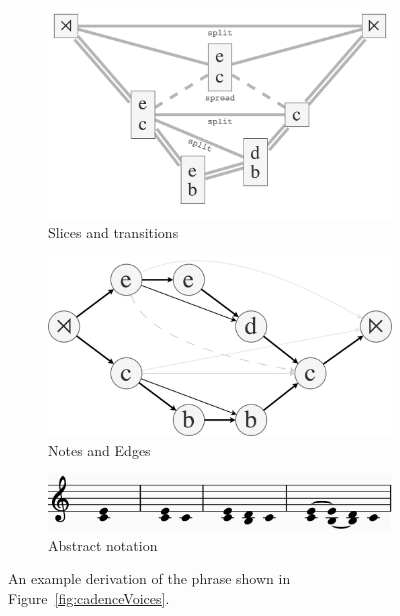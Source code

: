 \documentclass[12pt,a4paper,twoside,openright]{report}
\theoremstyle{definition}
\begin{document}
\begin{figure}[h]
  \centering
  \begin{subfigure}[t]{.55\textwidth}
    \centering\includegraphics[keepaspectratio,width=\textwidth]{prep/cadenceouterder.png}
    \caption{Slices and transitions}
    \label{fig:cadenceOuterDer}
  \end{subfigure}
  \begin{subfigure}[t]{.42\textwidth}
    \centering\includegraphics[keepaspectratio,width=\textwidth]{prep/cadenceinnerder.png}
    \caption{Notes and Edges}
    \label{fig:cadenceInnerDer}
  \end{subfigure}
  \begin{subfigure}[t]{.8\textwidth}
    \centering\includegraphics[keepaspectratio,width=\textwidth]{prep/cadencederivation.png}
    \caption{Abstract notation}
    \label{fig:cadenceDerivation}
  \end{subfigure}

  \captionsetup{width=.9\linewidth}
  \caption{An example derivation of the phrase shown in Figure~\ref{fig:cadenceVoices}. }
  \label{fig:innerOuterStructure}
\end{figure}
\end{document}
